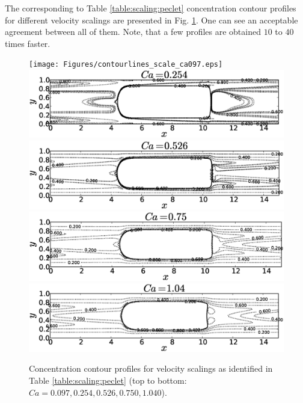 \documentclass{article}
\begin{document}
The corresponding to Table \ref{table:scaling:peclet} concentration contour profiles for different
velocity scalings are presented in Fig. \ref{fig:contours:scaling:peclet}. One can see an
acceptable agreement between all of them. Note, that a few profiles are obtained $10$ to $40$ times
faster.
\begin{figure}[htb!]
\texttt{[image: Figures/contourlines\_scale\_ca097.eps]}\\
\includegraphics[height=0.25\textwidth]{Figures/contourlines_scale_ca054.eps}\\
\includegraphics[height=0.25\textwidth]{Figures/contourlines_scale_ca026.eps}\\
\includegraphics[height=0.25\textwidth]{Figures/contourlines_scale_ca05.eps}\\
\includegraphics[height=0.25\textwidth]{Figures/contourlines_scale_ca14.eps}\\
\caption{Concentration contour profiles for velocity scalings as identified in Table
\ref{table:scaling:peclet} (top to bottom:
$Ca=0.097,0.254,0.526,0.750,1.040$).\label{fig:contours:scaling:peclet}}
\end{figure}
\end{document}
